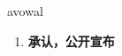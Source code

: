
\begin{frame}
{\huge avowal}
\begin{center}
\begin{enumerate}\Large
  \item \textbf{承认，公开宣布}
\end{enumerate}
\end{center}
\end{frame}
